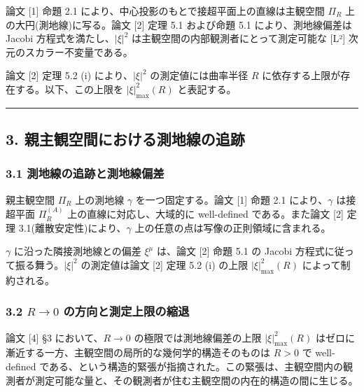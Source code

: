 \documentclass[a4paper,11pt]{ltjsarticle}
\theoremstyle{definition}
\begin{document}
論文 {[}1{]} 命題 2.1 により、中心投影のもとで接超平面上の直線は主観空間 \(\Pi_R\) 上の大円(測地線)に写る。論文 {[}2{]} 定理 5.1 および命題 5.1 により、測地線偏差は Jacobi 方程式を満たし、\(|\xi|^2\) は主観空間の内部観測者にとって測定可能な {[}L²{]} 次元のスカラー不変量である。

論文 {[}2{]} 定理 5.2 (i) により、\(|\xi|^2\) の測定値には曲率半径 \(R\) に依存する上限が存在する。以下、この上限を \(|\xi|^2_{\max}(R)\) と表記する。

\begin{center}\rule{0.5\linewidth}{0.5pt}\end{center}

\subsection{3. 親主観空間における測地線の追跡}\label{ux89aaux4e3bux89b3ux7a7aux9593ux306bux304aux3051ux308bux6e2cux5730ux7ddaux306eux8ffdux8de1}

\subsubsection{3.1 測地線の追跡と測地線偏差}\label{ux6e2cux5730ux7ddaux306eux8ffdux8de1ux3068ux6e2cux5730ux7ddaux504fux5dee}

親主観空間 \(\Pi_R\) 上の測地線 \(\gamma\) を一つ固定する。論文 {[}1{]} 命題 2.1 により、\(\gamma\) は接超平面 \(\Pi^{(A)}_R\) 上の直線に対応し、大域的に well-defined である。また論文 {[}2{]} 定理 3.1(離散安定性)により、\(\gamma\) 上の任意の点は写像の正則領域に含まれる。

\(\gamma\) に沿った隣接測地線との偏差 \(\xi^\mu\) は、論文 {[}2{]} 命題 5.1 の Jacobi 方程式に従って振る舞う。\(|\xi|^2\) の測定値は論文 {[}2{]} 定理 5.2 (i) の上限 \(|\xi|^2_{\max}(R)\) によって制約される。

\subsubsection{\texorpdfstring{3.2 \(R \to 0\) の方向と測定上限の縮退}{3.2 R \textbackslash to 0 の方向と測定上限の縮退}}\label{r-to-0-ux306eux65b9ux5411ux3068ux6e2cux5b9aux4e0aux9650ux306eux7e2eux9000}

論文 {[}4{]} §3 において、\(R \to 0\) の極限では測地線偏差の上限 \(|\xi|^2_{\max}(R)\) はゼロに漸近する一方、主観空間の局所的な幾何学的構造そのものは \(R > 0\) で well-defined である、という構造的緊張が指摘された。この緊張は、主観空間内の観測者が測定可能な量と、その観測者が住む主観空間の内在的構造の間に生じる。
\end{document}
